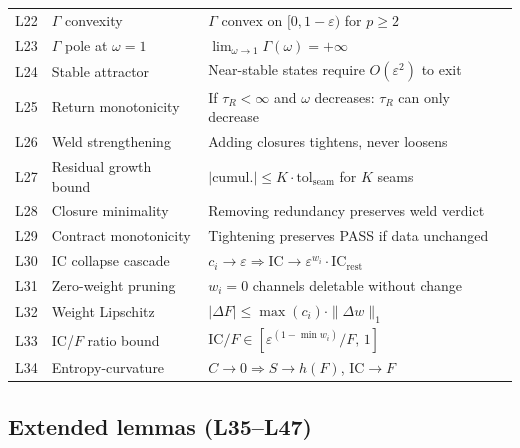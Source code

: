 \documentclass[
  aps,
  prd,
  twocolumn,
  superscriptaddress,
  nofootinbib,
  floatfix
]{revtex4-2}
\newcommand{\tR}{\tau_{\!R}}
\newcommand{\Gam}{\Gamma}
\newcommand{\eps}{\varepsilon}
\newcommand{\tolseam}{\mathrm{tol}_{\mathrm{seam}}}
\newcommand{\IC}{\mathrm{IC}}
\begin{document}
\begin{center}
{\begin{tabular}{@{}clp{4.0cm}@{}}
L22 & $\Gam$ convexity & $\Gam$ convex on $[0, 1{-}\eps)$ for $p \geq 2$ \\
L23 & $\Gam$ pole at $\omega = 1$ & $\lim_{\omega\to1}\Gam(\omega) = +\infty$ \\
L24 & Stable attractor & Near-stable states require $O(\eps^2)$ to exit \\
L25 & Return monotonicity & If $\tR < \infty$ and $\omega$ decreases: $\tR$ can only decrease \\
L26 & Weld strengthening & Adding closures tightens, never loosens \\
L27 & Residual growth bound & $|\text{cumul.}| \leq K \cdot \tolseam$ for $K$ seams \\
L28 & Closure minimality & Removing redundancy preserves weld verdict \\
L29 & Contract monotonicity & Tightening preserves PASS if data unchanged \\
L30 & IC collapse cascade & $c_i \to \eps \Longrightarrow \IC \to \eps^{w_i} \cdot \IC_\mathrm{rest}$ \\
L31 & Zero-weight pruning & $w_i = 0$ channels deletable without change \\
L32 & Weight Lipschitz & $|\Delta F| \leq \max(c_i) \cdot \|\Delta w\|_1$ \\
L33 & IC/$F$ ratio bound & $\IC/F \in [\eps^{(1-\min w_i)}/F, \, 1]$ \\
L34 & Entropy-curvature & $C \to 0 \Longrightarrow S \to h(F)$, $\IC \to F$ \\
\bottomrule
\end{tabular}}
\end{center}

\subsection{Extended lemmas (L35--L47)}
\end{document}
